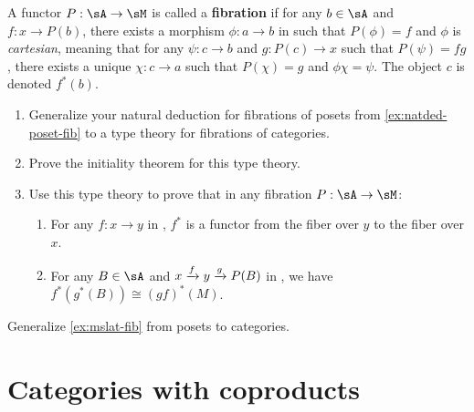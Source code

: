 \documentclass{book}
\begin{document}
\begin{ex}\label{ex:catfib}
  A functor $P:\sA\to \sM$ is called a \textbf{fibration} if for any $b\in \sA$ and $f:x\to P(b)$, there exists a morphism $\phi:a\to b$ in \sA such that $P(\phi)=f$ and $\phi$ is \emph{cartesian}, meaning that for any $\psi:c\to b$ and $g:P(c)\to x$ such that $P(\psi)=fg$, there exists a unique $\chi:c\to a$ such that $P(\chi)=g$ and $\phi\chi=\psi$.
  The object $c$ is denoted $f^*(b)$.
  \begin{enumerate}
  \item Generalize your natural deduction for fibrations of posets from \cref{ex:natded-poset-fib} to a type theory for fibrations of categories.
  \item Prove the initiality theorem for this type theory.
  \item Use this type theory to prove that in any fibration $P:\sA\to\sM$:
    \begin{enumerate}
    \item For any $f:x\to y$ in \sM, $f^*$ is a functor from the fiber over $y$ to the fiber over $x$.
    \item For any $B\in \sA$ and $x\xrightarrow{f} y \xrightarrow{g} P(B)$ in \sM, we have $f^*(g^*(B)) \cong (gf)^*(M)$.
    \end{enumerate}
  \end{enumerate}
\end{ex}

\begin{ex}\label{ex:catprod-fib}
  Generalize \cref{ex:mslat-fib} from posets to categories.
\end{ex}


\section{Categories with coproducts}
\label{sec:catcoprod}
\end{document}
